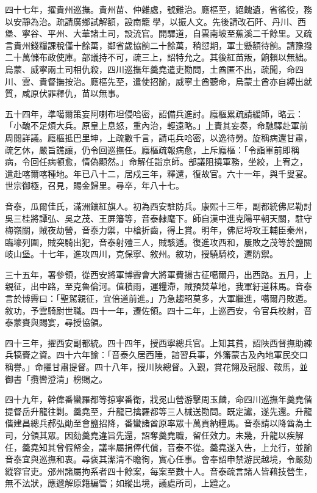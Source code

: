 \begin{pinyinscope}
四十七年，擢貴州巡撫。貴州苗、仲雜處，號難治。廕樞至，絕餽遺，省徭役，務以安靜為治。疏請廣鄉試解額，設南籠學，以振人文。先後請改石阡、丹川、西堡、寧谷、平州、大華諸土司，設流官。開驛道，自雲南坡至蕉溪二千餘里。又疏言貴州錢糧課稅僅十餘萬，鄰省歲協餉二十餘萬，稍愆期，軍士懸額待餉。請豫撥二十萬儲布政使庫。部議持不可，疏三上，詔特允之。其後紅苗叛，餉賴以無絀。烏蒙、威寧兩土司相仇殺，四川巡撫年羹堯遣吏勘問，土酋匿不出，疏聞，命四川、雲、貴督撫按治。廕樞先至，遣使招諭，威寧土酋聽命，烏蒙土酋亦自縛出就質，咸原伏罪釋仇，苗以無事。

五十四年，準噶爾策妄阿喇布坦侵哈密，詔備兵進討。廕樞累疏請緩師，略云：「小醜不足煩大兵。原皇上息怒，重內治，輕遠略。」上責其妄奏，命馳驛赴軍前周閱詳議。廕樞抵巴里坤，上疏數千言，請屯兵哈密，以逸待勞。旋稱病還甘肅，疏乞休，嚴旨譙讓，仍令回巡撫任。廕樞疏報病愈，上斥廕樞：「令詣軍前即稱病，令回任病頓愈，情偽顯然。」命解任詣京師。部議阻撓軍務，坐絞，上宥之，遣赴喀爾喀種地。年已八十二，居戍三年，釋還，復故官。六十一年，與千叟宴。世宗御極，召見，賜金歸里。尋卒，年八十七。

音泰，瓜爾佳氏，滿洲鑲紅旗人。初為西安駐防兵。康熙十三年，副都統佛尼勒討吳三桂將譚弘、吳之茂、王屏籓等，音泰隸麾下。師自漢中進克陽平朝天關，駐守梅嶺關，賊夜劫營，音泰力禦，中槍折齒，得上賞。明年，佛尼埒攻王輔臣秦州，臨壕列圍，賊突騎出犯，音泰射殪三人，賊駭遁。復進攻西和，屢敗之茂等於鹽關岐山堡。十七年，進攻四川，克保寧、敘州。敘功，授驍騎校，遷防禦。

三十五年，署參領，從西安將軍博霽會大將軍費揚古征噶爾丹，出西路。五月，上親征，出中路，至克魯倫河。值積雨，運糧滯，賊預焚草地，我軍紆道秣馬。音泰言於博霽曰：「聖駕親征，宜倍道前進。」乃急趨昭莫多，大軍繼進，噶爾丹敗遁。敘功，予雲騎尉世職。四十一年，遷佐領。四十二年，上巡西安，令官兵校射，音泰蒙賚與賜宴，尋授協領。

四十三年，擢西安副都統。四十四年，授西寧總兵官。上知其貧，詔陜西督撫助練兵犒賚之資。四十六年諭：「音泰久居西陲，諳習兵事，外籓蒙古及內地軍民交口稱譽。」命擢甘肅提督。四十八年，授川陜總督。入覲，賞花翎及冠服、鞍馬，並御書「攬轡澄清」榜賜之。

四十九年，幹偉番蠻羅都等掠寧番衛，戕冕山營游擊周玉麟，命四川巡撫年羹堯偕提督岳升龍往剿。羹堯至，升龍已擒羅都等三人械送勘問。既定讞，遂先還。升龍偕建昌總兵郝弘勛至會鹽招降，番蠻諸酋原率眾十萬貢納糧馬。音泰請以降酋為土司，分領其眾。因劾羹堯違旨先還，詔奪羹堯職，留任效力。未幾，升龍以疾解任，羹堯知其曾假帑金，議率屬捐俸代償，音泰不從。羹堯遂入告，上允行，並諭音泰宜與巡撫和衷。尋褒其潔清不瞻徇，實心任事。會奉詔申禁游民越境，令嚴劾縱容官吏。邠州諸屬拘系者四十餘案，每案至數十人。音泰疏言諸人皆藉技營生，無不法狀，應遞解原籍編管；如縱出境，議處所司，上韙之。


\end{pinyinscope}
